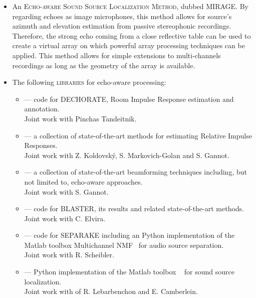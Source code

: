 \begin{itemize}
    \item An \textsc{Echo-aware Sound Source Localization Method}, dubbed \acs{MIRAGE}.
    By regarding echoes as image microphones, this method allows for source's azimuth and elevation estimation from passive stereophonic recordings.
    Therefore, the strong echo coming from a close reflective table can be used to create a virtual array on which powerful array processing techniques can be applied.
    This method allows for simple extensions to multi-channels recordings as long as the geometry of the array is available.

    \item The following \textsc{libraries} for echo-aware processing:
    \begin{itemize}[label={\scriptsize\faCode}]
        \item {} --- code for \acs{DECHORATE}, Room Impulse Response estimation and annotation.
        \\{\small Joint work with Pinchas Tandeitnik.}
        \item {} --- a collection of state-of-the-art methods for estimating Relative Impulse Responses.
        \\{\small Joint work with Z. Koldovsk\'{y}, S. Markovich-Golan and S. Gannot.}
        \item {} --- a collection of state-of-the-art beamforming techniques including, but not limited to, echo-aware approaches.
        \\{\small Joint work with S. Gannot.}
        \item {} --- code for \acs{BLASTER}, its results and related state-of-the-art methods.
        \\{\small Joint work with C. Elvira.}
        \item {} --- code for \acs{SEPARAKE} including an Python implementation of the Matlab toolbox Multichannel NMF~ for audio source separation.
        \\{\small Joint work with R. Scheibler.}
        \item {} --- Python implementation of the Matlab toolbox \href{http://bass-db.gforge.inria.fr/bss_locate/}{}~ for sound source localization.
        \\{\small Joint work with of R. Lebarbenchon and E. Camberlein.}


\end{itemize}
\end{itemize}
